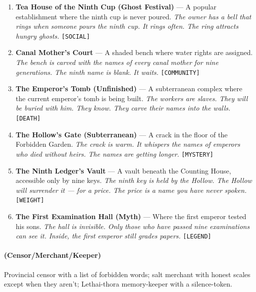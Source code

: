 \begin{enumerate}
  \hfill \textit{The scrolls burn as they fall. The smoke smells of ink and old blood. The well is bottomless.} \texttt{[DEATH]}
\item \textbf{Tea House of the Ninth Cup (Ghost Festival)} --- A popular establishment where the ninth cup is never poured.
  \hfill \textit{The owner has a bell that rings when someone pours the ninth cup. It rings often. The ring attracts hungry ghosts.} \texttt{[SOCIAL]}
\item \textbf{Canal Mother's Court} --- A shaded bench where water rights are assigned.
  \hfill \textit{The bench is carved with the names of every canal mother for nine generations. The ninth name is blank. It waits.} \texttt{[COMMUNITY]}
\item[\card{\spadesuit}{J}] \textbf{The Emperor's Tomb (Unfinished)} --- A subterranean complex where the current emperor's tomb is being built.
  \hfill \textit{The workers are slaves. They will be buried with him. They know. They carve their names into the walls.} \texttt{[DEATH]}
\item[\card{\spadesuit}{Q}] \textbf{The Hollow's Gate (Subterranean)} --- A crack in the floor of the Forbidden Garden.
  \hfill \textit{The crack is warm. It whispers the names of emperors who died without heirs. The names are getting longer.} \texttt{[MYSTERY]}
\item[\card{\spadesuit}{K}] \textbf{The Ninth Ledger's Vault} --- A vault beneath the Counting House, accessible only by nine keys.
  \hfill \textit{The ninth key is held by the Hollow. The Hollow will surrender it --- for a price. The price is a name you have never spoken.} \texttt{[WEIGHT]}
\item[\card{\spadesuit}{A}] \textbf{The First Examination Hall (Myth)} --- Where the first emperor tested his sons.
  \hfill \textit{The hall is invisible. Only those who have passed nine examinations can see it. Inside, the first emperor still grades papers.} \texttt{[LEGEND]}
\end{enumerate}

\paragraph*{(Censor/Merchant/Keeper)} Provincial censor with a list of forbidden words; salt merchant with honest scales except when they aren't; Lethai-thora memory-keeper with a silence-token.

